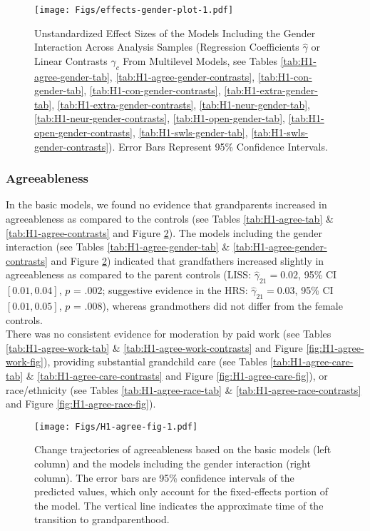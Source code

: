 \documentclass[
  english,
  man,floatsintext]{apa7}
\begin{document}
\begin{figure}
\centering
\texttt{[image: Figs/effects-gender-plot-1.pdf]}
\caption{\label{fig:effects-gender-plot}Unstandardized Effect Sizes of the Models Including the Gender Interaction Across Analysis Samples (Regression Coefficients \(\hat{\gamma}\) or Linear Contrasts \(\hat{\gamma}_{c}\) From Multilevel Models, see Tables \ref{tab:H1-agree-gender-tab}, \ref{tab:H1-agree-gender-contrasts}, \ref{tab:H1-con-gender-tab}, \ref{tab:H1-con-gender-contrasts}, \ref{tab:H1-extra-gender-tab}, \ref{tab:H1-extra-gender-contrasts}, \ref{tab:H1-neur-gender-tab}, \ref{tab:H1-neur-gender-contrasts}, \ref{tab:H1-open-gender-tab}, \ref{tab:H1-open-gender-contrasts}, \ref{tab:H1-swls-gender-tab}, \ref{tab:H1-swls-gender-contrasts}). Error Bars Represent 95\% Confidence Intervals.}
\end{figure}

\hypertarget{agreeableness}{%
\subsubsection{Agreeableness}\label{agreeableness}}

In the basic models, we found no evidence that grandparents increased in agreeableness as compared to the controls (see Tables \ref{tab:H1-agree-tab} \& \ref{tab:H1-agree-contrasts} and Figure \ref{fig:H1-agree-fig}). The models including the gender interaction (see Tables \ref{tab:H1-agree-gender-tab} \& \ref{tab:H1-agree-gender-contrasts} and Figure \ref{fig:H1-agree-fig}) indicated that grandfathers increased slightly in agreeableness as compared to the parent controls (LISS: \(\hat{\gamma}_{21} = 0.02\), 95\% CI \([0.01, 0.04]\), \(p\) = .002; suggestive evidence in the HRS: \(\hat{\gamma}_{21} = 0.03\), 95\% CI \([0.01, 0.05]\), \(p\) = .008), whereas grandmothers did not differ from the female controls.\\
There was no consistent evidence for moderation by paid work (see Tables \ref{tab:H1-agree-work-tab} \& \ref{tab:H1-agree-work-contrasts} and Figure \ref{fig:H1-agree-work-fig}), providing substantial grandchild care (see Tables \ref{tab:H1-agree-care-tab} \& \ref{tab:H1-agree-care-contrasts} and Figure \ref{fig:H1-agree-care-fig}), or race/ethnicity (see Tables \ref{tab:H1-agree-race-tab} \& \ref{tab:H1-agree-race-contrasts} and Figure \ref{fig:H1-agree-race-fig}).



\begin{figure}
\centering
\texttt{[image: Figs/H1-agree-fig-1.pdf]}
\caption{\label{fig:H1-agree-fig}Change trajectories of agreeableness based on the basic models (left column) and the models including the gender interaction (right column). The error bars are 95\% confidence intervals of the predicted values, which only account for the fixed-effects portion of the model. The vertical line indicates the approximate time of the transition to grandparenthood.}
\end{figure}
\end{document}

